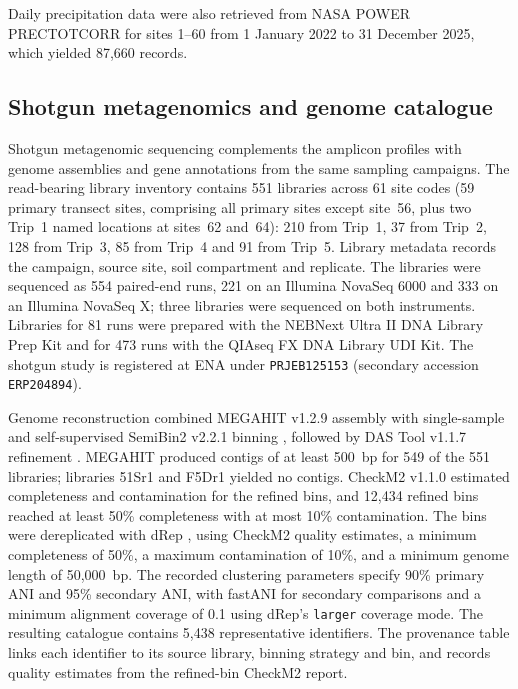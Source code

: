 \begin{revision}
Daily precipitation data were also retrieved from NASA POWER PRECTOTCORR for sites 1--60 from 1 January 2022 to 31 December 2025, which yielded 87,660 records.


% 

\subsection{Shotgun metagenomics and genome catalogue}\label{methods:shotgun}

Shotgun metagenomic sequencing complements the amplicon profiles with
genome assemblies and gene annotations from the same sampling campaigns.
The read-bearing library inventory contains 551 libraries across 61 site
codes (59 primary transect sites, comprising all primary sites except
site~56, plus two Trip~1 named locations at sites~62 and~64): 210 from
Trip~1, 37 from Trip~2, 128 from Trip~3, 85 from Trip~4 and 91 from
Trip~5. Library metadata records the campaign, source site, soil
compartment and replicate. The libraries were sequenced as 554
paired-end runs, 221 on an Illumina NovaSeq 6000 and 333 on an Illumina
NovaSeq X; three libraries were sequenced on both instruments. Libraries
for 81 runs were prepared with the NEBNext Ultra II DNA Library Prep Kit
and for 473 runs with the QIAseq FX DNA Library UDI Kit. The shotgun study is registered at ENA
under \texttt{PRJEB125153} (secondary accession \texttt{ERP204894}).

Genome reconstruction combined MEGAHIT v1.2.9 assembly \cite{megahit} with single-sample and
self-supervised SemiBin2 v2.2.1 binning \cite{semibin2}, followed by DAS Tool
v1.1.7 refinement \cite{dastool}. MEGAHIT produced contigs of at least
500~bp for 549 of the 551 libraries; libraries 51Sr1 and F5Dr1 yielded no
contigs. CheckM2 v1.1.0 \cite{checkm2} estimated completeness and contamination for the
refined bins, and 12,434 refined bins reached at least 50\% completeness
with at most 10\% contamination. The bins were dereplicated with dRep \cite{drep}, using
CheckM2 quality estimates, a minimum completeness of 50\%, a maximum
contamination of 10\%, and a minimum genome length of 50,000~bp.
The recorded clustering parameters specify 90\% primary ANI and
95\% secondary ANI, with fastANI for secondary comparisons and a minimum
alignment coverage of 0.1 using dRep's \texttt{larger} coverage mode.
The resulting catalogue contains 5,438 representative identifiers.
The provenance table links each identifier to its source library,
binning strategy and bin, and records quality estimates from the refined-bin
CheckM2 report.


\end{revision}
